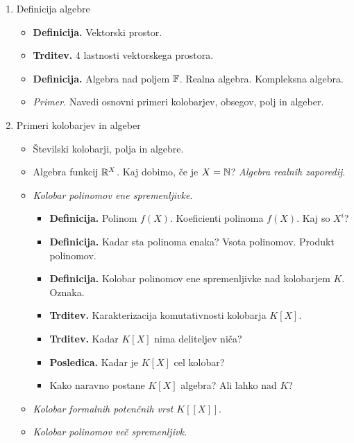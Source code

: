 \begin{enumerate}
    \item Definicija algebre
    \begin{itemize}
        \item \colorbox{purple!30}{\textbf{Definicija.}} Vektorski prostor.
        \item \colorbox{blue!30}{\textbf{Trditev.}} 4 lastnosti vektorskega prostora.
        \item \colorbox{purple!30}{\textbf{Definicija.}} Algebra nad poljem $\mathbb{F}$. Realna algebra. Kompleksna algebra.
        \item \colorbox{yellow!30}{\emph{Primer.}} Navedi osnovni primeri kolobarjev, obsegov, polj in algeber.
    \end{itemize}

    \item Primeri kolobarjev in algeber
    \begin{itemize}
        \item Številski kolobarji, polja in algebre.
        \item Algebra funkcij $\mathbb{R}^X$. Kaj dobimo, če je $X = \mathbb{N}$? \emph{Algebra realnih zaporedij}.
        \item \emph{Kolobar polinomov ene spremenljivke}.
        \begin{itemize}
            \item \colorbox{purple!30}{\textbf{Definicija.}} Polinom $f(X)$. Koeficienti polinoma $f(X)$. Kaj so $X^i$?
            \item \colorbox{purple!30}{\textbf{Definicija.}} Kadar sta polinoma enaka? Vsota polinomov. Produkt polinomov.
            \item \colorbox{purple!30}{\textbf{Definicija.}} Kolobar polinomov ene spremenljivke nad kolobarjem $K$. Oznaka.
            \item \colorbox{blue!30}{\textbf{Trditev.}} Karakterizacija komutativnosti kolobarja $K[X]$.
            \item \colorbox{blue!30}{\textbf{Trditev.}} Kadar $K[X]$ nima deliteljev niča?
            \item \colorbox{orange!30}{\textbf{Posledica.}} Kadar je $K[X]$ cel kolobar?
            \item Kako naravno postane $K[X]$ algebra? Ali lahko nad $K$?
        \end{itemize}
        \item \emph{Kolobar formalnih potenčnih vrst $K[[X]]$}.
        \item \emph{Kolobar polinomov več spremenljivk.}
        \begin{itemize}

\end{itemize}
\end{itemize}
\end{enumerate}
